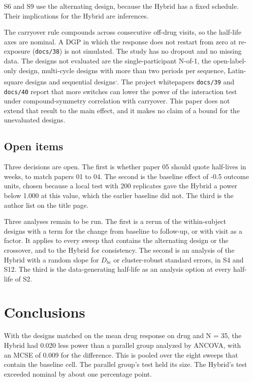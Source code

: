 \documentclass[
  11pt,
]{article}
\begin{document}
S6 and S9 use the alternating design, because the Hybrid has a fixed schedule. Their implications for the Hybrid are inferences.

The carryover rule compounds across consecutive off-drug visits, so the half-life axes are nominal. A DGP in which the response does not restart from zero at re-exposure (\texttt{docs/38}) is not simulated. The study has no dropout and no missing data. The designs not evaluated are the single-participant N-of-1, the open-label-only design, multi-cycle designs with more than two periods per sequence, Latin-square designs and sequential designs\textsuperscript{,}. The project whitepapers \texttt{docs/39} and \texttt{docs/40} report that more switches can lower the power of the interaction test under compound-symmetry correlation with carryover. This paper does not extend that result to the main effect, and it makes no claim of a bound for the unevaluated designs.

\subsection{Open items}\label{openitems}

Three decisions are open. The first is whether paper 05 should quote half-lives in weeks, to match papers 01 to 04. The second is the baseline effect of -0.5 outcome units, chosen because a local test with 200 replicates gave the Hybrid a power below 1.000 at this value, which the earlier baseline did not. The third is the author list on the title page.

Three analyses remain to be run. The first is a rerun of the within-subject designs with a term for the change from baseline to follow-up, or with visit as a factor. It applies to every sweep that contains the alternating design or the crossover, and to the Hybrid for consistency. The second is an analysis of the Hybrid with a random slope for \(D_{bc}\) or cluster-robust standard errors, in S4 and S12. The third is the data-generating half-life as an analysis option at every half-life of S2.

\section{Conclusions}\label{conclusions}

With the designs matched on the mean drug response on drug and N = 35, the Hybrid had 0.020 less power than a parallel group analyzed by ANCOVA, with an MCSE of 0.009 for the difference. This is pooled over the eight sweeps that contain the baseline cell. The parallel group's test held its size. The Hybrid's test exceeded nominal by about one percentage point.
\end{document}
